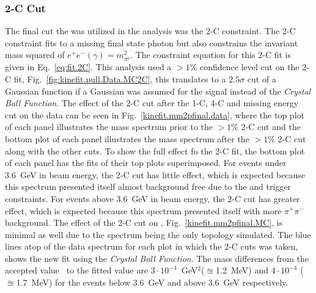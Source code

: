 \subsubsection{2-C Cut}\label{sec.2cfit}
The final cut the was utilized in the analysis was the 2-C constraint. The 2-C constraint fits to a missing final state photon but also constrains the invariant mass squared of $e^+e^-(\gamma) = m_{\pi^0}^2$. The constraint equation for this 2-C fit is given in Eq.~\ref{eq:fit.2C}. This analysis used a $>1\%$ confidence level cut on the 2-C fit, Fig.~\ref{fig:kinefit.pull.Data.MC2C}, this translates to a $2.5\sigma$ cut of a Gaussian function if a Gaussian was assumed for the signal instead of the \emph{Crystal Ball Function}. The effect of the 2-C cut after the 1-C, 4-C and missing energy cut on the data can be seen in Fig.~\ref{kinefit.mm2pfinal.data}, where the top plot of each panel illustrates the mass spectrum prior to the $>1\%$ 2-C cut and the bottom plot of each panel illustrates the mass spectrum after the $>1\%$ 2-C cut along with the other cuts. To show the full effect fo the 2-C fit, the bottom plot of each panel has the fits of their top plots superimposed. For events under 3.6~GeV in beam energy, the 2-C cut has little effect, which is expected because this spectrum presented itself almost background free due to the  and  trigger constraints. For events above 3.6~GeV in beam energy, the 2-C cut has greater effect, which is expected because this spectrum presented itself with more $\pi^+\pi^-$ background. The effect of the 2-C cut on , Fig.~\ref{kinefit.mm2pfinal.MC}, is minimal as well due to the \pizT spectrum being the only topology simulated. The blue lines atop of the data spectrum for each plot in which the 2-C cuts was taken, shows the new fit using the \emph{Crystal Ball Function}. The mass differences from the accepted value~\cite{pdg2014} to the fitted value are $3\cdot 10^{-4}$~GeV$^{2}$($\approxeq$1.2~MeV) and $4\cdot 10^{-4}$ ($\approxeq$1.7~MeV) for the events below 3.6~GeV and above 3.6~GeV respectively.
